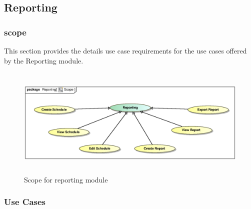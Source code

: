 \subsection{Reporting}

\subsubsection{scope}
\par{This section provides the details use case requirements for the use cases offered by the Reporting module.}

\begin{figure}[h]
\includegraphics[height=200px, width=500px]{epsImages/Reporting/ReportScope.eps}
\caption{Scope for reporting module}
\end{figure}

\subsubsection{Use Cases}

